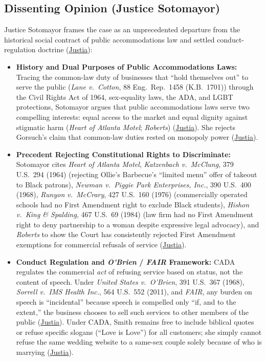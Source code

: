 \documentclass[12pt]{article}
\begin{document}
\subsection{Dissenting Opinion (Justice Sotomayor)}
Justice Sotomayor frames the case as an unprecedented departure from the historical social contract of public accommodations law and settled conduct-regulation doctrine (\href{https://supreme.justia.com/cases/federal/us/600/21-476/}{Justia}):
\begin{itemize}
  \item \textbf{History and Dual Purposes of Public Accommodations Laws:} Tracing the common-law duty of businesses that ``hold themselves out'' to serve the public (\textit{Lane v.\ Cotton}, 88 Eng.\ Rep.\ 1458 (K.B.\ 1701)) through the Civil Rights Act of 1964, sex-equality laws, the ADA, and LGBT protections, Sotomayor argues that public accommodations laws serve two compelling interests: equal access to the market and equal dignity against stigmatic harm (\textit{Heart of Atlanta Motel}; \textit{Roberts}) (\href{https://supreme.justia.com/cases/federal/us/600/21-476/}{Justia}). She rejects Gorsuch's claim that common-law duties rested on monopoly power (\href{https://supreme.justia.com/cases/federal/us/600/21-476/}{Justia}).
  \item \textbf{Precedent Rejecting Constitutional Rights to Discriminate:} Sotomayor cites \textit{Heart of Atlanta Motel}, \textit{Katzenbach v.\ McClung}, 379 U.S.\ 294 (1964) (rejecting Ollie's Barbecue's ``limited menu'' offer of takeout to Black patrons), \textit{Newman v.\ Piggie Park Enterprises, Inc.}, 390 U.S.\ 400 (1968), \textit{Runyon v.\ McCrary}, 427 U.S.\ 160 (1976) (commercially operated schools had no First Amendment right to exclude Black students), \textit{Hishon v.\ King \& Spalding}, 467 U.S.\ 69 (1984) (law firm had no First Amendment right to deny partnership to a woman despite expressive legal advocacy), and \textit{Roberts} to show the Court has consistently rejected First Amendment exemptions for commercial refusals of service (\href{https://supreme.justia.com/cases/federal/us/600/21-476/}{Justia}).
  \item \textbf{Conduct Regulation and \textit{O'Brien} / \textit{FAIR} Framework:} CADA regulates the commercial \emph{act} of refusing service based on status, not the content of speech. Under \textit{United States v.\ O'Brien}, 391 U.S.\ 367 (1968), \textit{Sorrell v.\ IMS Health Inc.}, 564 U.S.\ 552 (2011), and \textit{FAIR}, any burden on speech is ``incidental'' because speech is compelled only ``if, and to the extent,'' the business chooses to sell such services to other members of the public (\href{https://supreme.justia.com/cases/federal/us/600/21-476/}{Justia}). Under CADA, Smith remains free to include biblical quotes or refuse specific slogans (``Love is Love'') for all customers; she simply cannot refuse the same wedding website to a same-sex couple solely because of who is marrying (\href{https://supreme.justia.com/cases/federal/us/600/21-476/}{Justia}).

\end{itemize}
\end{document}
